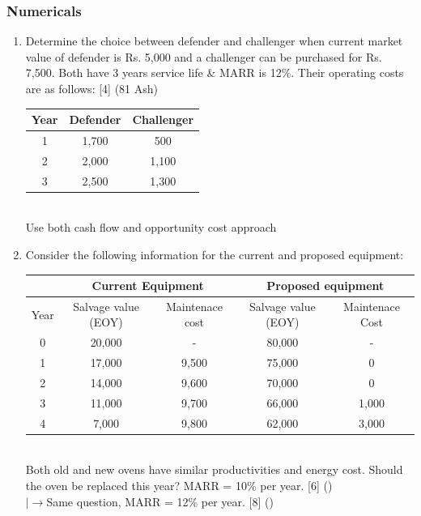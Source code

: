\documentclass[12pt]{article}
\newcommand{\lb}{\\ $\left|\rightarrow\right.$}
\begin{document}
		\subsubsection{Numericals}
			\begin{enumerate}
				\item Determine the choice between defender and challenger when current market value of defender is Rs. 5,000 and a challenger can be purchased for Rs. 7,500. Both have 3 years service life \& MARR is 12\%. Their operating costs are as follows: \hfill [4] (81 Ash)\\
				\begin{tabular}{|c|c|c|}
					\hline
					Year & Defender & Challenger \\ \hline
					1 & 1,700 & 500 \\ \hline
					2 & 2,000 & 1,100 \\ \hline
					3 & 2,500 & 1,300 \\ \hline
				\end{tabular}\\
				Use both cash flow and opportunity cost approach

				\item Consider the following information for the current and proposed equipment:\\
				\begin{tabular}{|c|c|c|c|c|}
					\hline
					& \multicolumn{2}{|c|}{Current Equipment} & \multicolumn{2}{|c|}{Proposed equipment} \\ \hline
					Year & Salvage value (EOY) & Maintenace cost & Salvage value (EOY) & Maintenace Cost \\ \hline
					0 & 20,000 & - & 80,000 & - \\ \hline
					1 & 17,000 & 9,500 & 75,000 & 0 \\ \hline
					2 & 14,000 & 9,600 & 70,000 & 0 \\ \hline
					3 & 11,000 & 9,700 & 66,000 & 1,000 \\ \hline
					4 & 7,000 & 9,800 & 62,000 & 3,000 \\ \hline
				\end{tabular}\\
				Both old and new ovens have similar productivities and energy cost. Should the oven be replaced this year? MARR = 10\% per year. \hfill [6] ()
				\lb Same question, MARR = 12\% per year. \hfill [8] ()


\end{enumerate}
\end{document}

